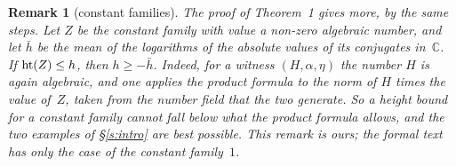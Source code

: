 \documentclass[11pt,a4paper]{article}
\newcommand{\m}[1]{\mbox{$#1$}}        %
\theoremstyle{plainx}
\theoremstyle{uprightx}
\newtheorem{remark}[theorem]{Remark}
\newcommand{\CC}{\mathbb{C}}
\begin{document}
\begin{remark}[constant families]\label{r:constant}
The proof of Theorem~1 gives more, by the same steps. Let $Z$ be the constant family with value a non-zero
algebraic number, and let $\bar h$ be the mean of the logarithms of the absolute values of its conjugates
in~$\CC$. If \m{\hle{h}{Z}}, then \m{h\ge-\bar h}. Indeed, for a witness $(H,\alpha,\eta)$ the number $H$ is again
algebraic, and one applies the product formula to the norm of $H$ times the value of~$Z$, taken from the number
field that the two generate. So a height bound for a constant family cannot fall below what the product formula
allows, and the two examples of §\ref{s:intro} are best possible. This remark is ours; the formal text has only the
case of the constant family~$1$.
\end{remark}
\end{document}
